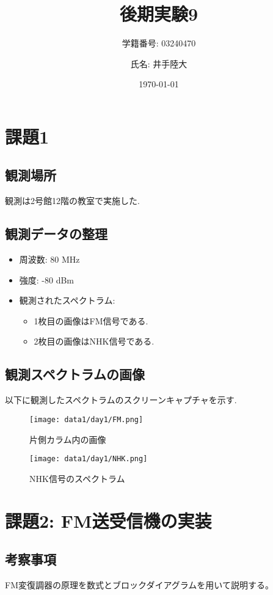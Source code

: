 \documentclass[a4paper, twocolumn]{article} %
\title{後期実験9}
\author{学籍番号: 03240470 \and 氏名: 井手陸大}
\date{\today}
\begin{document}
\maketitle

\section{課題1}
\subsection{観測場所}
観測は2号館12階の教室で実施した.

\subsection{観測データの整理}
\begin{itemize}
    \item 周波数: 80 MHz
    \item 強度: -80 dBm
    \item 観測されたスペクトラム:
    \begin{itemize}
        \item 1枚目の画像はFM信号である.
        \item 2枚目の画像はNHK信号である.
    \end{itemize}
\end{itemize}

\subsection{観測スペクトラムの画像}
以下に観測したスペクトラムのスクリーンキャプチャを示す.

\begin{figure}[H]
    \centering
    \texttt{[image: data1/day1/FM.png]}
    \caption{片側カラム内の画像}
    \label{fig:image1}
\end{figure}

\begin{figure}[H]
    \centering
    \texttt{[image: data1/day1/NHK.png]}
    \caption{NHK信号のスペクトラム}
    \label{fig:nhk_spectrum}
\end{figure}


\section*{課題2: FM送受信機の実装}

\subsection*{考察事項}
FM変復調器の原理を数式とブロックダイアグラムを用いて説明する。
\end{document}
